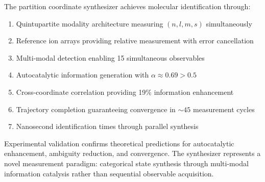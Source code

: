 The partition coordinate synthesizer achieves molecular identification through:
\begin{enumerate}
\item Quintupartite modality architecture measuring $(n,l,m,s)$ simultaneously
\item Reference ion arrays providing relative measurement with error cancellation
\item Multi-modal detection enabling 15 simultaneous observables
\item Autocatalytic information generation with $\alpha \approx 0.69 > 0.5$
\item Cross-coordinate correlation providing 19\% information enhancement
\item Trajectory completion guaranteeing convergence in $\sim 45$ measurement cycles
\item Nanosecond identification times through parallel synthesis
\end{enumerate}

Experimental validation confirms theoretical predictions for autocatalytic enhancement, ambiguity reduction, and convergence. The synthesizer represents a novel measurement paradigm: categorical state synthesis through multi-modal information catalysis rather than sequential observable acquisition.
